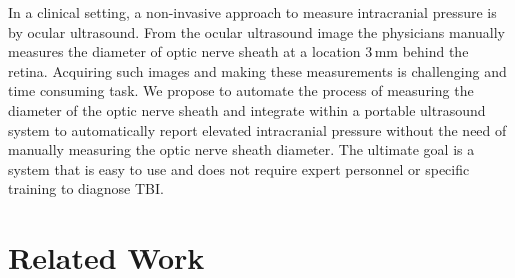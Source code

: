 \documentclass{llncs}
\begin{document}
In a clinical setting, a non-invasive approach to measure intracranial pressure is
by ocular ultrasound. From the ocular ultrasound image the physicians manually
measures the diameter of optic nerve sheath at a location 3\,mm behind the retina.
Acquiring such images and making these measurements is challenging and time
consuming task. We propose to automate the process of measuring the diameter of
the optic nerve sheath and integrate within a portable ultrasound system to
automatically report elevated intracranial pressure without the need of manually
measuring the optic nerve sheath diameter. The ultimate goal is a system that is
easy to use and does not require expert personnel or specific training to
diagnose TBI.    

\section{Related Work}
\end{document}
